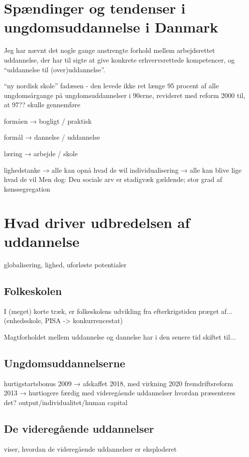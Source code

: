 \chapter{Spændinger og tendenser i ungdomsuddannelse i Danmark}

Jeg har nævnt det nogle gange anstrengte forhold mellem arbejdsrettet uddannelse, der har til sigte at give konkrete erhvervsrettede kompetencer, og “uddannelse til (over)uddannelse”.

“ny nordisk skole” fadæsen - den levede ikke ret længe
95 procent af alle ungdomsårgange på ungdomsuddannelser i 90erne, revideret med reform 2000 til, at 97?? skulle gennemføre

formåen → bogligt / praktisk

formål → dannelse / uddannelse

læring → arbejde / skole

lighedstanke  → alle kan opnå hvad de wil
individualisering → alle kan blive lige hvad de vil
Men dog: Den sociale arv er stadigvæk gældende; stor grad af kønssegregation


\chapter{Hvad driver udbredelsen af uddannelse}


globalisering, lighed, uforløste potentialer

\section{Folkeskolen}
I (meget) korte træk, er folkeskolens udvikling fra efterkrigstiden præget af... (enhedsskole, PISA -> konkurrencestat)

Magtforholdet mellem uddannelse og dannelse har i den senere tid skiftet til...

\section{Ungdomsuddannelserne}

hurtigstartsbonus 2009 → afskaffet 2018, med virkning 2020
fremdriftsreform 2013 → hurtiogere færdig med videregående uddannelser
hvordan præsenteres det? output/individualitet/human capital
\section{De videregående uddannelser}
\autocite{schoferWorldwideExpansionHigher2005} viser, hvordan de videregående uddannelser er eksploderet 

